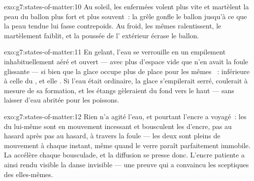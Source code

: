 \begin{solution}{exo:g7:states-of-matter:10}
Au soleil, les  enfermées volent plus vite et martèlent la
peau du ballon plus fort et plus souvent~: la grêle gonfle le ballon
jusqu'à ce que la peau tendue lui fasse contrepoids. Au froid, les
mêmes  ralentissent, le martèlement faiblit, et la poussée
de l' extérieur écrase le ballon.
\end{solution}

\begin{solution}{exo:g7:states-of-matter:11}
En gelant, l'eau se verrouille en un empilement inhabituellement
aéré et ouvert --- avec plus d'espace vide que n'en avait la foule
glissante --- si bien que la glace occupe plus de place pour les
mêmes ~:  inférieure à celle du , et
elle . Si l'eau était ordinaire, la glace s'empilerait serré,
coulerait à mesure de sa formation, et les étangs gèleraient du fond
vers le haut --- sans laisser d'eau abritée pour les poissons.
\end{solution}

\begin{solution}{exo:g7:states-of-matter:12}
Rien n'a agité l'eau, et pourtant l'encre a voyagé~: les  du
 lui-même sont en mouvement incessant et bousculent les
 d'encre, pas au hasard après pas au hasard, à travers la
foule --- les deux  sont pleins de mouvement à chaque
instant, même quand le verre paraît parfaitement immobile. La 
accélère chaque bousculade, et la diffusion se presse donc. L'encre
patiente a ainsi rendu visible la danse invisible --- une preuve qui
a convaincu les sceptiques des  elles-mêmes.
\end{solution}

